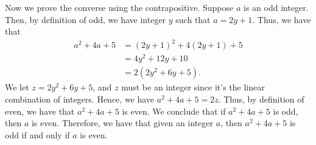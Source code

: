 \documentclass[12pt]{article}
\begin{document}
Now we prove the converse using the contrapositive.
Suppose $a$ is an odd integer.
Then, by definition of odd, we have integer $y$ such that $a = 2y+1$.
Thus, we have that
\begin{align*}
    a^2 + 4a + 5 & = (2y+1)^2 + 4(2y+1) + 5 \\
                 & = 4y^2 + 12y + 10        \\
                 & = 2(2y^2 + 6y + 5).
\end{align*}
We let $z = 2y^2 + 6y + 5$, and $z$ must be an integer since it's the linear combination of integers.
Hence, we have $a^2 + 4a + 5 = 2z$.
Thus, by definition of even, we have that $a^2 + 4a + 5$ is even.
We conclude that if $a^2 + 4a + 5$ is odd, then $a$ is even.
Therefore, we have that given an integer $a$, then $a^2 + 4a + 5$ is odd if and only if $a$ is even.
\end{document}
